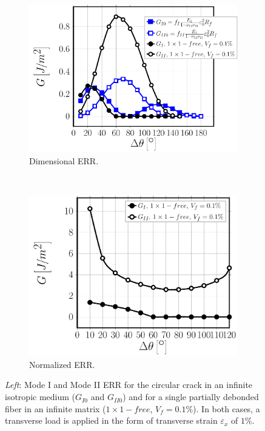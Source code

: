\documentclass[review]{elsarticle}
\begin{document}
\begin{figure}[!h]
\centering
    \begin{subfigure}[b]{0.5\textwidth}
        \includegraphics[width=\textwidth]{comparescaling-Vf01.pdf}
        \caption{Dimensional ERR.}\label{subfig:comparescalingVf01}
    \end{subfigure} ~
    \begin{subfigure}[b]{0.45\textwidth}
        \includegraphics[width=\textwidth]{comparescaling-Vf01-normalized.pdf}
        \caption{Normalized ERR.}\label{subfig:comparescalingVf01normalized}
    \end{subfigure}

\caption{\textit{Left}: Mode I and Mode II ERR for the circular crack in an infinite isotropic medium ($G_{I0}$ and $G_{II0}$) and for a single partially debonded fiber in an infinite matrix ($1\times 1-free$, $V_{f}=0.1\%$). In both cases, a transverse load is applied in the form of transverse strain $\varepsilon_{x}$ of $1\%$.}\label{fig:comparescalingVf01}
\end{figure}
\end{document}
